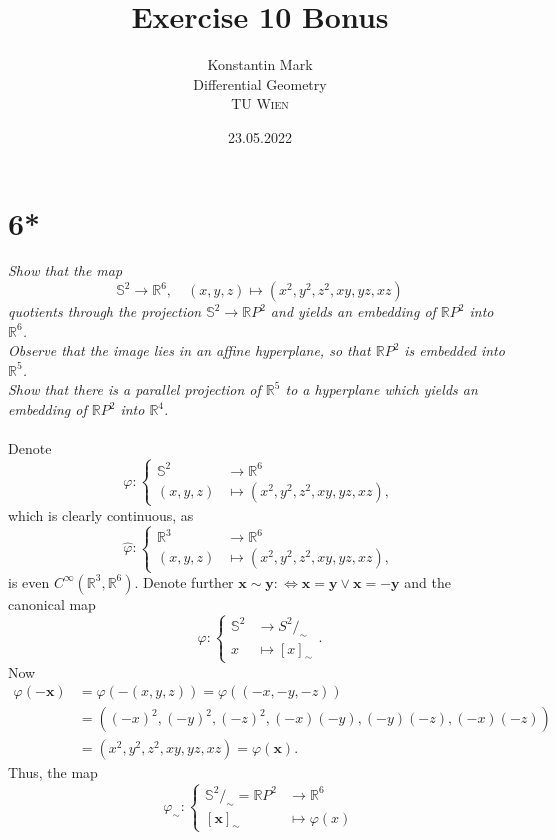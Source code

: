 \documentclass[11pt]{article}
\title{Exercise 10 Bonus}
\author{Konstantin Mark\\
Differential Geometry\\ 
\textsc{TU Wien}
}
\date{23.05.2022}
\begin{document}
\maketitle

\section*{6*}
{\itshape Show that the map \begin{equation*}
    \mathbb S^2\to \mathbb R^6, \quad (x,y,z)\mapsto (x^2,y^2,z^2, xy,yz,xz)
\end{equation*}quotients through the projection $\mathbb S^2\to \mathbb RP^2$ and yields an embedding of $\mathbb RP^2$ into $\mathbb R^6$.\\
Observe that the image lies in an affine hyperplane, so that $\mathbb RP^2$ is embedded into $\mathbb R^5$.\\
Show that there is a parallel projection of $\mathbb R^5$ to a hyperplane which yields an embedding of $\mathbb RP^2$ into $\mathbb R^4$.}
\\~\\
Denote 
    $$\varphi: 
        \begin{cases}
            \mathbb S^2&\to \mathbb R^6\\
            (x,y,z)&\mapsto (x^2,y^2,z^2, xy,yz,xz),
        \end{cases}
    $$ which is clearly continuous, as 
    $$\hat\varphi: 
        \begin{cases}
            \mathbb R^3&\to \mathbb R^6\\
            (x,y,z)&\mapsto (x^2,y^2,z^2, xy,yz,xz),
        \end{cases}
    $$ is even $C^\infty(\mathbb R^3,\mathbb R^6)$. Denote further
$\mathbf x\sim \mathbf y :\Leftrightarrow \mathbf x = \mathbf y \lor \mathbf x = -\mathbf y$ and the canonical map 
$$\varphi: 
        \begin{cases}
            \mathbb S^2&\to S^2/_\sim\\
            x&\mapsto [x]_\sim
        \end{cases}.
$$
Now \begin{align*}
    \varphi(-\mathbf x) &= \varphi(-(x,y,z)) = \varphi((-x,-y,-z)) \\&= ((-x)^2, (-y)^2,(-z)^2, (-x)(-y), (-y)(-z), (-x)(-z)) \\&= (x^2,y^2,z^2, xy,yz,xz) = \varphi(\mathbf x).
\end{align*}
Thus, the map 
    $$\varphi_\sim: 
        \begin{cases}
            \mathbb S^2/_\sim = \mathbb RP^2&\to \mathbb R^6\\
            [\mathbf x]_\sim&\mapsto\varphi(x)
        \end{cases}
    $$
\end{document}
